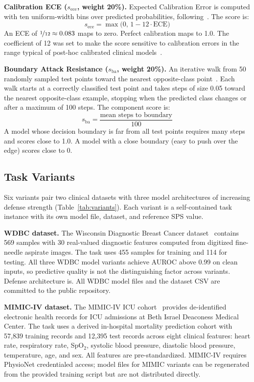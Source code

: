 \documentclass[11pt]{article}
\begin{document}
\textbf{Calibration ECE ($s_{\text{ece}}$, weight 20\%).}
Expected Calibration Error is computed with ten uniform-width bins over
predicted probabilities, following~\citet{guo2017calibration}. The score is:
\[
s_{\text{ece}} = \max\!\bigl(0,\, 1 - 12 \cdot \text{ECE}\bigr)
\]
An ECE of $\nicefrac{1}{12} \approx 0.083$ maps to zero. Perfect calibration
maps to 1.0. The coefficient of 12 was set to make the score sensitive to
calibration errors in the range typical of post-hoc calibrated clinical
models~\citep{platt1999probabilistic}.

\textbf{Boundary Attack Resistance ($s_{\text{ba}}$, weight 20\%).}
An iterative walk from 50 randomly sampled test points toward the nearest
opposite-class point~\citep{brendel2018decision}. Each walk starts at a
correctly classified test point and takes steps of size 0.05 toward the
nearest opposite-class example, stopping when the predicted class changes or
after a maximum of 100 steps. The component score is:
\[
s_{\text{ba}} = \frac{\text{mean steps to boundary}}{100}
\]
A model whose decision boundary is far from all test points requires many
steps and scores close to 1.0. A model with a close boundary (easy to push
over the edge) scores close to 0.

\subsection{Task Variants}
\label{sec:variants}

Six variants pair two clinical datasets with three model architectures
of increasing defense strength (Table~\ref{tab:variants}). Each variant
is a self-contained task instance with its own model file, dataset, and
reference SPS value.

\textbf{WDBC dataset.}
The Wisconsin Diagnostic Breast Cancer dataset~\citep{dua2019uci} contains
569 samples with 30 real-valued diagnostic features computed from digitized
fine-needle aspirate images. The task uses 455 samples for training and 114
for testing. All three WDBC model variants achieve AUROC above 0.99 on clean
inputs, so predictive quality is not the distinguishing factor across variants.
Defense architecture is. All WDBC model files and the dataset CSV are committed
to the public repository.

\textbf{MIMIC-IV dataset.}
The MIMIC-IV ICU cohort~\citep{johnson2023mimic,goldberger2000physiobank}
provides de-identified electronic health records for ICU admissions at
Beth Israel Deaconess Medical Center. The task uses a derived in-hospital
mortality prediction cohort with 57,839 training records and 12,395 test
records across eight clinical features: heart rate, respiratory rate, SpO$_2$,
systolic blood pressure, diastolic blood pressure, temperature, age, and sex.
All features are pre-standardized. MIMIC-IV requires PhysioNet credentialed
access; model files for MIMIC variants can be regenerated from the provided
training script but are not distributed directly.
\end{document}
